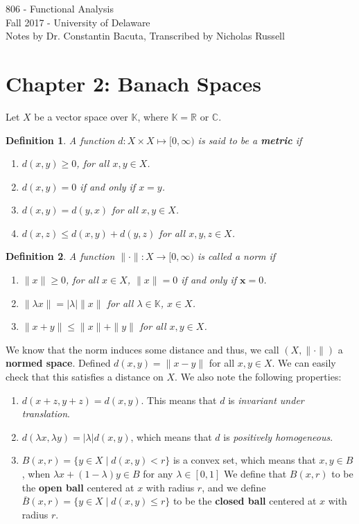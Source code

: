 \documentclass[12pt]{article}
\newtheorem{definition}{Definition}
\newcommand{\R}{{\mathbb R}}
\newcommand{\C}{{\mathbb C}}
\def\K{\mathbb{K}}
\newcommand{\ov}{\overline}
\newcommand{\vtf}{{\vspace{-25pt}}}
\newcommand{\mx}{\mathbf{x}}
\begin{document}
\pagestyle{myheadings}


{\bf \large
\begin{center}
806 - Functional Analysis \\
Fall 2017 - University of Delaware \\
Notes by Dr. Constantin Bacuta, Transcribed by Nicholas Russell
\end{center}
}
%

\noindent
\section*{Chapter 2: Banach Spaces}
Let $X$  be a vector space over $\K$, where $\K = \R$ or $\C$. 
\begin{definition}
A function $d: X \times X \mapsto [0, \infty)$ is said to be a \textbf{metric} if 
\vtf
\begin{enumerate}
\item[(D1)] $d(x, y) \geq 0$, for all $x, y \in X$. 
\item[(D2)] $d(x, y) = 0$ if and only if $x = y$.
\item[(D3)] $d(x, y) = d(y, x)$ for all $x, y \in X$.
\item[(D4)] $d(x, z) \leq d(x, y) + d(y, z)$ for all $x, y, z \in X$. 
\end{enumerate}
\end{definition}
\begin{definition}
A function $\| \cdot \| : X \to [0, \infty)$ is called a norm if 
\vtf
\begin{enumerate}
\item[(N1)] $\| x \| \geq 0$, for all $x \in X$, $\| x \| = 0$ if and only if $\mx = 0$. 
\item[(N2)] $\| \lambda x \| = | \lambda | \| x \|$ for all $ \lambda \in \K$, $x \in X$. 
\item[(N3)] $\| x + y \| \leq \| x \| + \| y \|$ for all $x, y \in X$. 
\end{enumerate}
\end{definition}
\vtf
We know that the norm induces some distance and thus, we call $(X, \| \cdot \|)$ a \textbf{normed space}. Defined $d(x, y) = \| x - y \|$ for all $x, y \in X$. We can easily check that this satisfies a distance on $X$. 
We also note the following properties: 
\begin{enumerate}[topsep=-15pt]
\item $d(x + z, y + z) = d(x, y)$. This means that $d$ is \textit{invariant under translation}.
\item $d(\lambda x, \lambda y) = |\lambda| d(x, y)$, which means that $d$ is \textit{positively homogeneous}. 
\item $B(x, r) = \{ y \in X \mid d(x, y) < r \}$ is a convex set, which means that $x, y \in B$, when $\lambda x + (1 - \lambda) y \in B$ for any $\lambda \in [0, 1]$ We define that $B(x,r)$ to be the \textbf{open ball} centered at $x$ with radius $r$, and we define $\ov{B}(x, r) = \{ y \in X \mid d(x, y) \leq r \}$ to be the \textbf{closed ball} centered at $x$ with radius $r$. 
\end{enumerate}
\end{document}
